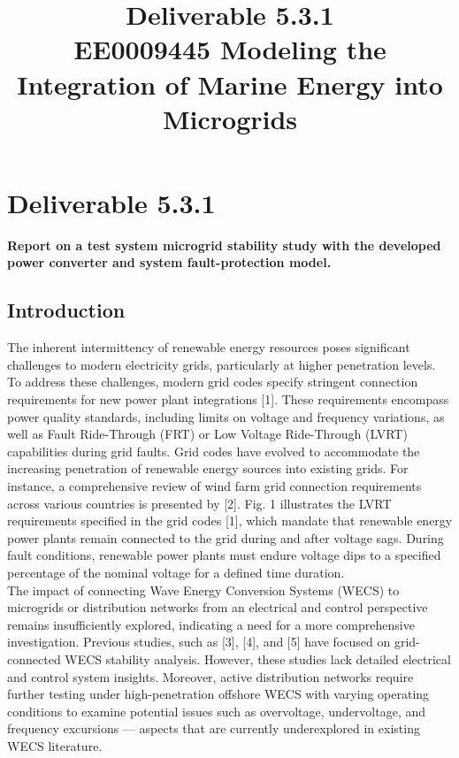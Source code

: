 \documentclass[conference]{IEEEtran}
\begin{document}
\title{Deliverable 5.3.1\\

\vspace{10pt}
\footnotesize{EE0009445 Modeling the Integration of Marine Energy into Microgrids}
}

\maketitle

\section{Deliverable 5.3.1}

\textbf{Report on a test system microgrid stability study with
the developed power converter and system fault-protection
model.}



\subsection{Introduction}



The inherent intermittency of renewable energy resources poses significant challenges to modern electricity grids, particularly at higher penetration levels. To address these challenges, modern grid codes specify stringent connection requirements for new power plant integrations [1]. These requirements encompass power quality standards, including limits on voltage and frequency variations, as well as Fault Ride-Through (FRT) or Low Voltage Ride-Through (LVRT) capabilities during grid faults. Grid codes have evolved to accommodate the increasing penetration of renewable energy sources into existing grids. For instance, a comprehensive review of wind farm grid connection requirements across various countries is presented by [2]. Fig. 1 illustrates the LVRT requirements specified in the  grid codes [1], which mandate that renewable energy power plants remain connected to the grid during and after voltage sags. During fault conditions, renewable power plants must endure voltage dips to a specified percentage of the nominal voltage for a defined time duration.\\

The impact of connecting Wave Energy Conversion Systems (WECS) to microgrids or distribution networks from an electrical and control perspective remains insufficiently explored, indicating a need for a more comprehensive investigation. Previous studies, such as [3], [4], and [5] have focused on grid-connected WECS stability analysis. However, these studies lack detailed electrical and control system insights. Moreover, active distribution networks require further testing under high-penetration offshore WECS with varying operating conditions to examine potential issues such as overvoltage, undervoltage, and frequency excursions — aspects that are currently underexplored in existing WECS literature.\\
\end{document}
